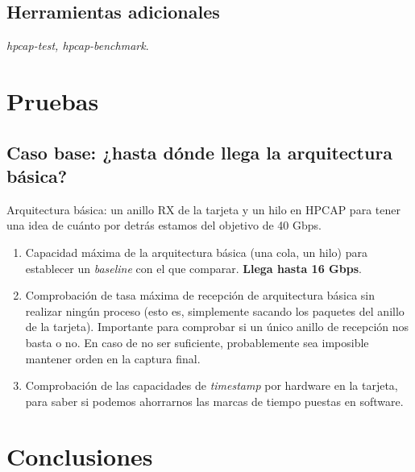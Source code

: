 \documentclass[twoside, draft]{epstfg}
\begin{document}
\section{Herramientas adicionales}

\textit{hpcap-test, hpcap-benchmark}.

\chapter{Pruebas}

\section{Caso base: ¿hasta dónde llega la arquitectura básica?}

Arquitectura básica: un anillo RX de la tarjeta y un hilo en HPCAP para tener una idea de cuánto por detrás estamos del objetivo de 40 Gbps.

\begin{enumerate}
\item Capacidad máxima de la arquitectura básica (una cola, un hilo) para establecer un \textit{baseline} con el que comparar. \textbf{Llega hasta 16 Gbps}.
\item Comprobación de tasa máxima de recepción de arquitectura básica sin realizar ningún proceso (esto es, simplemente sacando los paquetes del anillo de la tarjeta). Importante para comprobar si un único anillo de recepción nos basta o no. En caso de no ser suficiente, probablemente sea imposible mantener orden en la captura final.
\item Comprobación de las capacidades de \textit{timestamp} por hardware en la tarjeta, para saber si podemos ahorrarnos las marcas de tiempo puestas en software.
\end{enumerate}


\chapter{Conclusiones}

\appendix

\printnoidxglossaries
\cleardoublepage

\nocite{*}
{}

\cleardoublepage
\printindex
\end{document}
